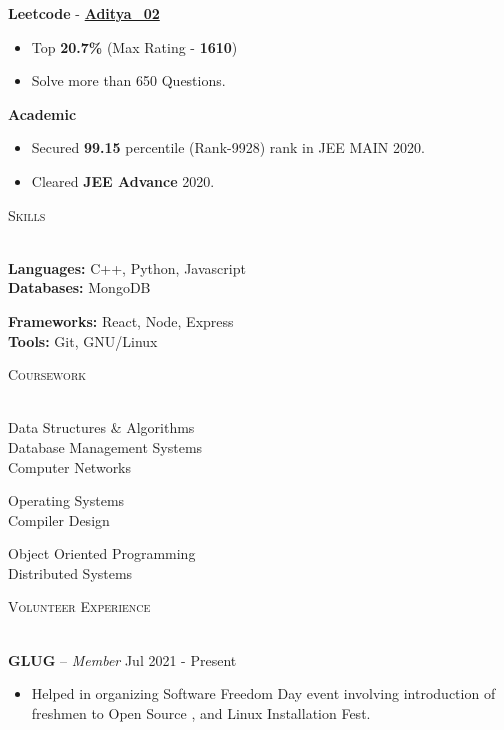\documentclass[10pt]{article}
\newcommand{\tinyBulletSep} { \vspace{1.2mm} }
\newcommand{\bulletSep} { \vspace{2.2mm} }
\newcommand{\sectionSep} { \vspace{3mm} }
\newcommand{\lineunder} {
    \vspace*{-8pt} \\
    \hspace*{-15pt} \hrulefill \\
}
\newcommand{\header} [1] {
    {\hspace*{-18pt}\vspace*{6pt} {
        \fontfamily{qcs}\selectfont \large \scshape #1
    }}
    \vspace*{-6pt} \lineunder
    \vspace{0.5mm}
}
\newcommand{\volunteerItem}[5]{
    \textbf{#1} -- \textit{#2} \hfill #3 \\
    \begin{itemize}
        #4
    \end{itemize}
}
\begin{document}
 \textbf{Leetcode} - \textbf{\href{https://leetcode.com/Aditya_02/}{Aditya\_02}}
\begin{itemize}
    \item Top \textbf{20.7\%} (Max Rating - \textbf{1610})
    \item Solve more than 650 Questions.
\end{itemize}
\tinyBulletSep

 \textbf{Academic} 
\begin{itemize}
    \item Secured \textbf{99.15} percentile (Rank-9928) rank in JEE MAIN 2020.
    \item Cleared \textbf{JEE Advance} 2020.
\end{itemize}

\tinyBulletSep
\sectionSep


\header{Skills}
\begin{minipage}[t]{0.6\textwidth}
    \textbf{Languages:} C++, Python, Javascript\\
    \textbf{Databases:} MongoDB\\
\end{minipage}
\hfill
\begin{minipage}[t]{0.33\textwidth}
    \textbf{Frameworks:} React, Node, Express\\
    \textbf{Tools:} Git, GNU/Linux
\end{minipage}
\sectionSep

\header{Coursework}
\begin{minipage}[t]{0.4\textwidth}
    Data Structures \& Algorithms\\
    Database Management Systems\\
    Computer Networks
\end{minipage}
\hfill
\begin{minipage}[t]{0.25\textwidth}
    Operating Systems\\
    Compiler Design
\end{minipage}
\hfill
\begin{minipage}[t]{0.3\textwidth}
    Object Oriented Programming\\
    Distributed Systems
\end{minipage}
\hfill
\sectionSep


\header{Volunteer Experience}

\volunteerItem{GLUG}{Member}{Jul 2021 - Present}{
    \item Helped in organizing Software Freedom Day event involving introduction of freshmen to Open Source , and Linux Installation Fest.
}

\bulletSep
\end{document}
